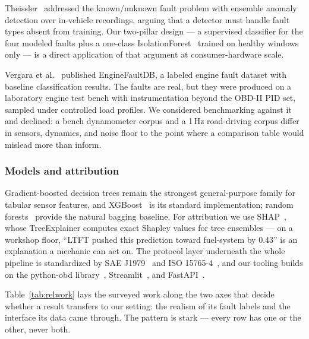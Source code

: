 Theissler~\cite{theissler2017} addressed the known/unknown fault problem
with ensemble anomaly detection over in-vehicle recordings, arguing that a
detector must handle fault types absent from training. Our two-pillar
design --- a supervised classifier for the four modeled faults plus a
one-class IsolationForest~\cite{liu2008} trained on healthy windows only ---
is a direct application of that argument at consumer-hardware scale.

Vergara et al.~\cite{vergara2023} published EngineFaultDB, a labeled engine
fault dataset with baseline classification results. The faults are real, but
they were produced on a laboratory engine test bench with instrumentation
beyond the OBD-II PID set, sampled under controlled load profiles. We
considered benchmarking against it and declined: a bench dynamometer corpus
and a 1\,Hz road-driving corpus differ in sensors, dynamics, and noise floor
to the point where a comparison table would mislead more than inform.

\subsubsection{Models and attribution}

Gradient-boosted decision trees remain the strongest general-purpose family
for tabular sensor features, and XGBoost~\cite{chen2016} is its standard
implementation; random forests~\cite{breiman2001} provide the natural
bagging baseline. For attribution we use SHAP~\cite{lundberg2017}, whose
TreeExplainer computes exact Shapley values for tree ensembles --- on a
workshop floor, ``LTFT pushed this prediction toward fuel-system by 0.43''
is an explanation a mechanic can act on. The protocol layer underneath the
whole pipeline is standardized by SAE J1979~\cite{saej1979} and
ISO 15765-4~\cite{iso15765}, and our tooling builds on the python-obd
library~\cite{pythonobd}, Streamlit~\cite{streamlit}, and
FastAPI~\cite{fastapi}.

Table~\ref{tab:relwork} lays the surveyed work along the two axes that
decide whether a result transfers to our setting: the realism of its fault
labels and the interface its data came through. The pattern is stark ---
every row has one or the other, never both.


